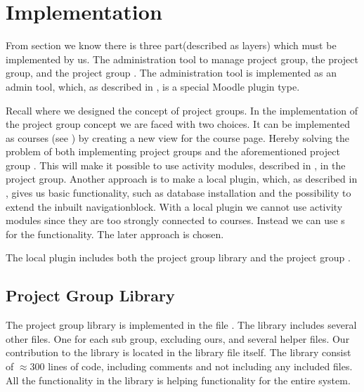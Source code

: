\chapter{Implementation}
\label{chap:implementation}
From section  we know there is three part(described as layers) which must be implemented by us. 
The administration tool to manage project group, the project group, and the project group \viewroom. 
The administration tool is implemented as an admin tool, which, as described in , is a special Moodle plugin type. 

Recall  where we designed the concept of project groups.
In the implementation of the project group concept we are faced with two choices. 
It can be implemented as courses (see ) by creating a new view for the course page. 
Hereby solving the problem of both implementing project groups and the aforementioned project group \viewroom.
This will make it possible to use activity modules, described in , in the project group. 
Another approach is to make a local plugin, which, as described in , gives us basic functionality, such as database installation and the possibility to extend the inbuilt navigationblock. 
With a local plugin we cannot use activity modules since they are too strongly connected to courses. 
Instead we can use \block{}s for the functionality. 
The later approach is chosen. 

The local plugin includes both the project group library and the project group \viewroom. 


\section{Project Group Library}
\label{sec:pglib}
The project group library is implemented in the file . 
The library includes several other files. %
One for each sub group, excluding ours, and several helper files. 
Our contribution to the library is located in the library file itself. 
The library consist of $\approx 300$ lines of code, including comments and not including any included files. 
All the functionality in the library is helping functionality for the entire system. 

